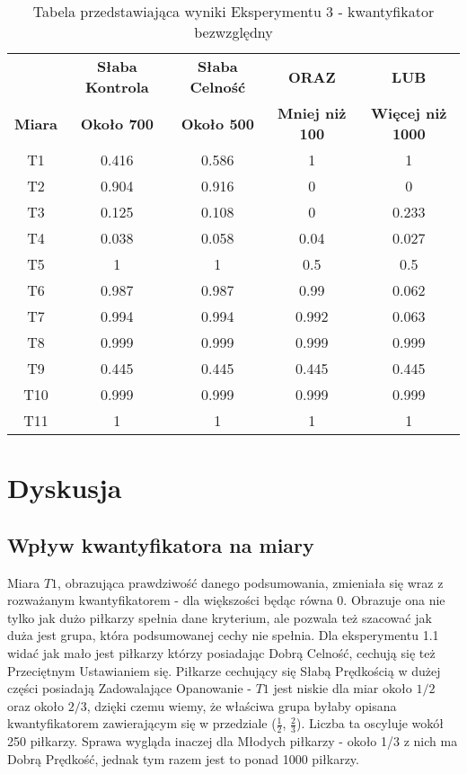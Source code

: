 \documentclass{classrep}
\begin{document}
\begin{table}[H]
	\centering
	\begin{tabular}{c c c c c } 
		\hline
		& \textbf{Słaba Kontrola} & \textbf{Słaba Celność} & \textbf{ORAZ} & \textbf{LUB}\\ [0.5ex] 
		\textbf{Miara} & \textbf{Około 700} & \textbf{Około 500} & \textbf{Mniej niż 100} & \textbf{Więcej niż 1000}\\ [0.5ex] 
		\hline
		\hline 
		T1 & 0.416 & 0.586 & 1 & 1 \\
		T2 & 0.904 & 0.916 & 0 & 0 \\
		T3 & 0.125 & 0.108 & 0 & 0.233 \\
		T4 & 0.038 & 0.058 & 0.04 & 0.027 \\
		T5 & 1 & 1 & 0.5 & 0.5 \\
		T6 & 0.987 & 0.987 & 0.99 & 0.062 \\
		T7 & 0.994 & 0.994 & 0.992 & 0.063 \\
		T8 & 0.999 & 0.999 & 0.999 & 0.999 \\
		T9 & 0.445 & 0.445 & 0.445 & 0.445 \\
		T10 & 0.999 & 0.999 & 0.999 & 0.999 \\
		T11 & 1 & 1 & 1 & 1 \\
		\hline
	\end{tabular}
	\caption{Tabela przedstawiająca wyniki Eksperymentu 3 - kwantyfikator bezwzględny}
\end{table}

\section{Dyskusja}

\subsection{Wpływ kwantyfikatora na miary}

Miara $T1$, obrazująca prawdziwość danego podsumowania, zmieniała się wraz z rozważanym kwantyfikatorem - dla większości będąc równa 0. Obrazuje ona nie tylko jak dużo piłkarzy spełnia dane kryterium, ale pozwala też szacować jak duża jest grupa, która podsumowanej cechy nie spełnia. Dla eksperymentu 1.1 widać jak mało jest piłkarzy którzy posiadając Dobrą Celność, cechują się też Przeciętnym Ustawianiem się. Piłkarze cechujący się Słabą Prędkością w dużej części posiadają Zadowalające Opanowanie - $T1$ jest niskie dla miar około $1/2$ oraz około $2/3$, dzięki czemu wiemy, że właściwa grupa byłaby opisana kwantyfikatorem zawierającym się w przedziale ($\frac{1}{2}$, $\frac{2}{3}$). Liczba ta oscyluje wokół 250 piłkarzy. Sprawa wygląda inaczej dla Młodych piłkarzy - około 1/3 z nich ma Dobrą Prędkość, jednak tym razem jest to ponad 1000 piłkarzy. 
\newline
\end{document}
